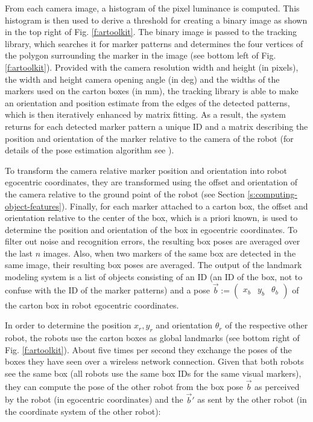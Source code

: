 From each camera image, a histogram of the pixel luminance is
computed. This histogram is then used to derive a threshold for
creating a binary image as shown in the top right of Fig.
\ref{f:artoolkit}. The binary image is passed to the tracking library,
which searches it for marker patterns and determines the four vertices
of the polygon surrounding the marker in the image (see bottom left of
Fig. \ref{f:artoolkit}). Provided with the camera resolution width
and height (in pixels), the width and height camera opening angle (in
deg) and the widths of the markers used on the carton boxes (in mm),
the tracking library is able to make an orientation and position
estimate from the edges of the detected patterns, which is then
iteratively enhanced by matrix fitting. As a result, the system
returns for each detected marker pattern a unique ID and a matrix
describing the position and orientation of the marker relative to the
camera of the robot (for details of the pose estimation algorithm
see \citealt*{kato99marker}).

To transform the camera relative marker position and orientation into
robot egocentric coordinates, they are transformed using the offset
and orientation of the camera relative to the ground point of the
robot (see Section \ref{s:computing-object-features}).  Finally, for
each marker attached to a carton box, the offset and orientation
relative to the center of the box, which is a priori known, is used to
determine the position and orientation of the box in egocentric
coordinates. To filter out noise and recognition errors, the resulting
box poses are averaged over the last $n$ images. Also, when two
markers of the same box are detected in the same image, their
resulting box poses are averaged.  The output of the landmark modeling
system is a list of objects consisting of an ID (an ID of the box, not
to confuse with the ID of the marker patterns) and a pose
$\vec{b}:=\begin{pmatrix}x_b & y_b & \theta_b\end{pmatrix}$ of the
carton box in robot egocentric coordinates.


In order to determine the position $x_r,y_r$ and orientation
$\theta_r$ of the respective other robot, the robots use the carton
boxes as global landmarks (see bottom right of Fig.
\ref{f:artoolkit}). About five times per second they exchange the
poses of the boxes they have seen over a wireless network
connection. Given that both robots see the same box (all robots use
the same box IDs for the same visual markers), they can compute the
pose of the other robot from the box pose $\vec{b}$ as perceived by
the robot (in egocentric coordinates) and the $\vec{b}'$ as sent by
the other robot (in the coordinate system of the other robot):

